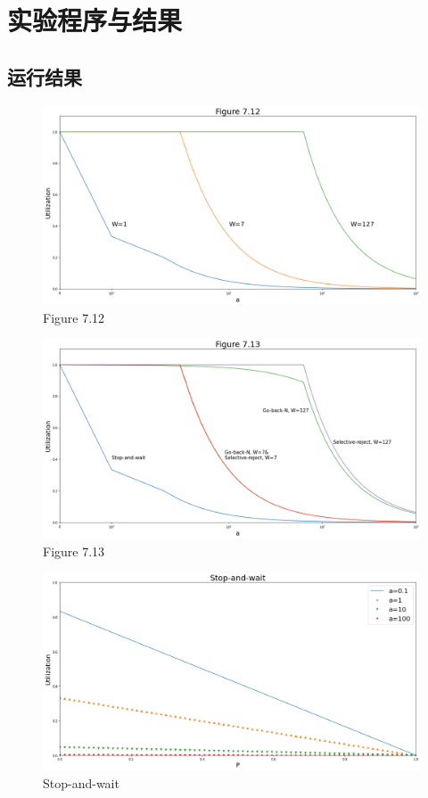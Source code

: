\documentclass[a4paper]{ctexart}
\begin{document}
    \newpage
    \section{实验程序与结果}
    \subsection{运行结果}

    \begin{figure}[H]
      \includegraphics*[width=1\textwidth]{fig/figure12.png}
      \caption{Figure 7.12}
    \end{figure}
    \begin{figure}[H]
      \includegraphics*[width=1\textwidth]{fig/figure13.png}
      \caption{Figure 7.13}
    \end{figure}
    \newpage
    \begin{figure}[H]
      \includegraphics*[width=1\textwidth]{fig/stopandwait.png}
      \caption{Stop-and-wait}
    \end{figure}
\end{document}
